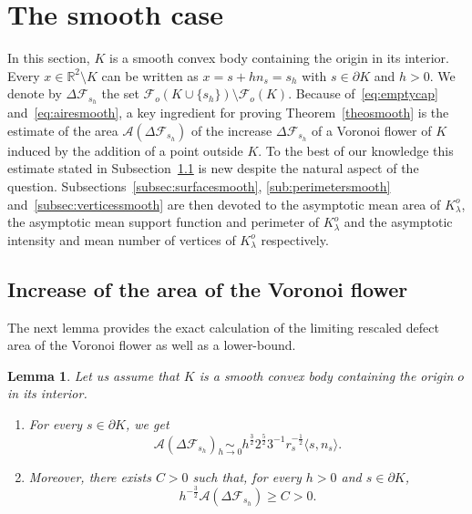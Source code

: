 \documentclass[10pt]{amsart}
\newtheorem{lemm}[theo]{Lemma}\newtheorem{prop}[theo]{Proposition}\newtheorem{coro}[theo]{Corollary}\newtheorem{conj}[theo]{Conjecture}
\theoremstyle{definition}\newtheorem{defi}[theo]{Definition}\newtheorem{rema}[theo]{Remark}\newtheorem{exam}[theo]{Example}\newtheorem{exem}[theo]{Example}\newtheorem{nota}[theo]{Notation}
\newcommand{\cA}{\mathcal{A}}
\newcommand{\cF}{\mathcal{F}}
\newcommand{\R}{\mathbb{R}}
\newcommand{\pass}{\vspace{0.3cm}\noindent}
\newcommand{\noi}{\noindent}
\newcommand*{\romanenumi}{\renewcommand*{\theenumi}{\roman{enumi}}}
\begin{document}
\section{The smooth case}\label{sec:smooth}

In this section, $K$ is a smooth convex body containing the origin in its interior. Every $x\in\R^2\setminus K$ can be written as $x=s+hn_s=s_h$ with $s\in\partial K$ and $h>0$. We denote by $\Delta\cF_{s_h}$ the set $\cF_o(K\cup \{s_h\})\setminus \cF_o(K)$. Because of~\eqref{eq:emptycap} and~\eqref{eq:airesmooth}, a key ingredient for proving Theorem~\ref{theosmooth} is the estimate of the area $\cA(\Delta\cF_{s_h})$ of the increase $\Delta \cF_{s_h}$ of a Voronoi flower of $K$ induced by the addition of a point outside $K$. To the best of our knowledge this estimate stated in Subsection~\ref{subsec:fleursmooth} is new despite the natural aspect of the question. Subsections~\ref{subsec:surfacesmooth}, \ref{sub:perimetersmooth} and~\ref{subsec:verticessmooth} are then devoted to the asymptotic mean area of $K_{\lambda}^o$, the asymptotic mean support function and perimeter of $K_{\lambda}^o$ and the asymptotic intensity and mean number of vertices of $K_{\lambda}^o$ respectively.


\subsection{Increase of the area of the Voronoi flower}\label{subsec:fleursmooth}


The next lemma provides the exact calculation of the limiting rescaled defect area of the Voronoi flower as well as a lower-bound.

\begin{lemm}\label{lem:geom}
Let us assume that $K$ is a smooth convex body containing the origin $o$ in its interior.
\begin{enumerate}\romanenumi
\item \label{estimeevolfleur}For every $s\in\partial K$, we get
\begin{equation*}
\cA(\Delta\cF_{s_h})\underset{h\to 0}{\sim} h^{\frac{3}{2}} 2^{\frac{5}{2}}3^{-1}r_s^{-\frac1{2}}\langle s, n_s\rangle.
\end{equation*}
\item \label{eq:minorantvol}Moreover, there exists $C>0$ such that, for every $h>0$ and $s\in\partial K$,
\begin{equation*}
h^{-\frac{3}{2}}\cA(\Delta\cF_{s_h}) \ge C >0.
\end{equation*}
\end{enumerate}
\end{lemm}
\end{document}
